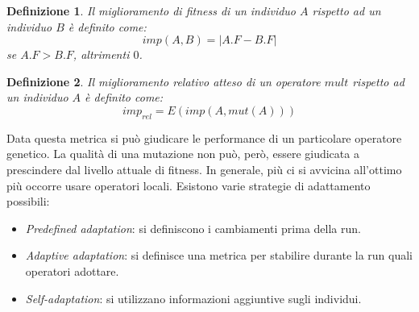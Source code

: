 \documentclass[10pt,a4paper]{article}
\newtheorem{definition}{Definizione}
\begin{document}
\begin{definition}
Il \emph{miglioramento di fitness} di un individuo $A$ rispetto ad un individuo $B$ è definito come:
$$
imp(A,B) = |A.F - B.F|
$$ 
se $A.F > B.F$, altrimenti $0$.
\end{definition}

\begin{definition}
Il \emph{miglioramento relativo atteso} di un operatore $mult$ rispetto ad un individuo $A$ è definito come:
$$
imp_{rel} = E(imp(A,mut(A)))
$$ 
\end{definition}

Data questa metrica si può giudicare le performance di un particolare operatore genetico. La qualità di una mutazione non può, però, essere giudicata a prescindere dal livello attuale di fitness. In generale, più ci si avvicina all'ottimo più occorre usare operatori locali. Esistono varie strategie di adattamento possibili:

\begin{itemize}
\item{\emph{Predefined adaptation}: si definiscono i cambiamenti prima della run.}
\item{\emph{Adaptive adaptation}: si definisce una metrica per stabilire durante la run quali operatori adottare.}
\item{\emph{Self-adaptation}: si utilizzano informazioni aggiuntive sugli individui.}
\end{itemize}
\end{document}

